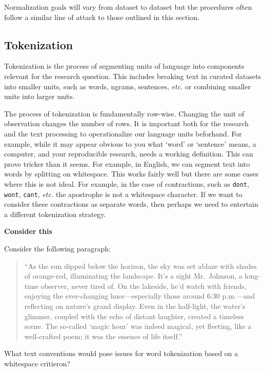 \documentclass[
  letterpaper,
  krantz1]{latex/krantz-mod}
\theoremstyle{definition}
\theoremstyle{definition}
\theoremstyle{remark}
\begin{document}
Normalization goals will vary from dataset to dataset but the procedures
often follow a similar line of attack to those outlined in this section.

\subsection{Tokenization}\label{sec-transform-tokenization}

Tokenization is the process of segmenting units of language into
components relevant for the research question. This includes breaking
text in curated datasets into smaller units, such as words, ngrams,
sentences, \emph{etc.} or combining smaller units into larger units.

The process of tokenization is fundamentally row-wise. Changing the unit
of observation changes the number of rows. It is important both for the
research and the text processing to operationalize our language units
beforhand. For example, while it may appear obvious to you what `word'
or `sentence' means, a computer, and your reproducible research, needs a
working definition. This can prove tricker than it seems. For example,
in English, we can segment text into words by splitting on whitespace.
This works fairly well but there are some cases where this is not ideal.
For example, in the case of contractions, such as
\texttt{don\textquotesingle{}t}, \texttt{won\textquotesingle{}t},
\texttt{can\textquotesingle{}t}, \emph{etc.} the apostrophe is not a
whitespace character. If we want to consider these contractions as
separate words, then perhaps we need to entertain a different
tokenization strategy.

\begin{tcolorbox}[enhanced jigsaw, leftrule=.75mm, colframe=quarto-callout-color-frame, left=2mm, colback=white, toprule=.15mm, breakable, arc=.35mm, opacityback=0, bottomrule=.15mm, rightrule=.15mm]

\textbf{ Consider this}

Consider the following paragraph:

\begin{quote}
``As the sun dipped below the horizon, the sky was set ablaze with
shades of orange-red, illuminating the landscape. It's a sight
Mr.~Johnson, a long-time observer, never tired of. On the lakeside, he'd
watch with friends, enjoying the ever-changing hues---especially those
around 6:30 p.m.---and reflecting on nature's grand display. Even in the
half-light, the water's glimmer, coupled with the echo of distant
laughter, created a timeless scene. The so-called `magic hour' was
indeed magical, yet fleeting, like a well-crafted poem; it was the
essence of life itself.''
\end{quote}

What text conventions would pose issues for word tokenization based on a
whitespace critieron?

\end{tcolorbox}
\end{document}
